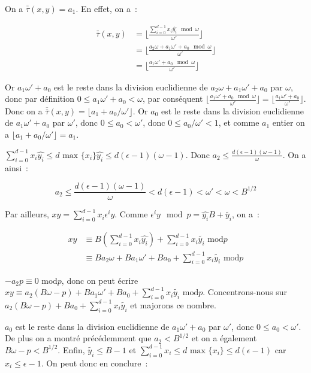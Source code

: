     On a $\overline{\overline{\tau}}(x,y) = a_1$. En effet, on a~:

    \begin{align*}
    \overline{\overline{\tau}}(x,y) &= \lfloor \frac{\sum_{i=0}^{d-1} x_i \hat{y_i}\mod \omega}{\omega'} \rfloor \\
                                    &= \lfloor \frac{a_2\omega + a_1\omega' + a_0\mod \omega}{\omega'} \rfloor \\
                                    &= \lfloor \frac{a_1\omega' + a_0\mod \omega}{\omega'} \rfloor
    \end{align*}

    Or $a_1\omega' + a_0$ est le reste dans la division euclidienne de $a_2\omega + a_1\omega' + a_0$ par $\omega$, donc par définition $0 \leq a_1\omega' + a_0 <  \omega$, par conséquent $\lfloor \frac{a_1\omega' + a_0\mod \omega}{\omega'} \rfloor = \lfloor \frac{a_1\omega' + a_0}{\omega'} \rfloor$. Donc on a $\overline{\overline{\tau}}(x,y) = \lfloor a_1 + a_0/\omega' \rfloor$. Or $a_0$ est le reste dans la division euclidienne de $a_1\omega' + a_0$ par $\omega'$, donc $0 \leq a_0 < \omega'$, donc $0 \leq a_0/\omega' < 1$, et comme $a_1$ entier on a $\lfloor a_1 + a_0/\omega' \rfloor = a_1$.

    $\sum_{i=0}^{d-1} x_i \hat{y_i} \leq d \text{\ max }\{x_i\} \hat{y_i} \leq d(\epsilon - 1)(\omega - 1)$. Donc $a_2 \leq \frac{d(\epsilon - 1)(\omega - 1)}{\omega}$. On a ainsi~:

    $$a_2 \leq \frac{d(\epsilon - 1)(\omega - 1)}{\omega} < d(\epsilon - 1) < \omega' < \omega < B^{1/2} $$

    Par ailleurs, $xy = \sum_{i=0}^{d-1} x_i \epsilon^i y$. Comme $\epsilon^i y\mod p = \hat{y_i} B + \tilde{y_i}$, on a~:

    \begin{align*}
        xy &\equiv B(\sum_{i=0}^{d-1} x_i \hat{y_i}) + \sum_{i=0}^{d-1} x_i \tilde{y_i} \text{\ mod} p \\
           &\equiv B a_2\omega + B a_1\omega' + B a_0 + \sum_{i=0}^{d-1} x_i \tilde{y_i} \text{\ mod} p
    \end{align*}

    $-a_2 p \equiv 0 \text{\ mod} p$, donc on peut écrire $xy \equiv a_2(B\omega - p) + B a_1\omega' + B a_0 + \sum_{i=0}^{d-1} x_i \tilde{y_i} \text{\ mod} p$. Concentrons-nous sur $a_2(B\omega - p) + B a_0 + \sum_{i=0}^{d-1} x_i \tilde{y_i}$ et majorons ce nombre.

    $a_0$ est le reste dans la division euclidienne de $a_1\omega' + a_0$ par $\omega'$, donc $0 \leq a_0 < \omega'$. De plus on a montré précédemment que $a_2 < B^{1/2}$ et on a également $B\omega - p < B^{1/2}$. Enfin, $\tilde{y_i} \leq B - 1$ et $\sum_{i=0}^{d-1} x_i \leq d \text{\ max $\{x_i\}$} \leq d(\epsilon - 1)$ car $x_i \leq \epsilon - 1$. On peut donc en conclure~:

